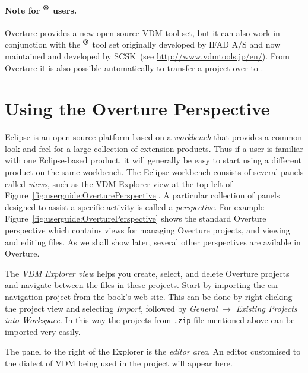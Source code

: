 \paragraph{Note for \vdmtools$^{\mbox{\small\textbf{{\textregistered}}}}$ users.} 
Overture provides a new open source VDM tool set, but it can also work
in conjunction with the
\vdmtools$^{\mbox{\small\textbf{{\textregistered}}}}$
tool set originally developed by IFAD A/S and now maintained and
developed by SCSK~(see
\url{http://www.vdmtools.jp/en/}). From Overture it is also possible
automatically to transfer a project over to \vdmtools.
 
\section{Using the Overture Perspective}\label{sec:vdmsupport}

Eclipse is an open source platform based on a \emph{workbench} that
provides a common look and feel for a large collection of extension
products. Thus if a user is familiar with one Eclipse-based product,
it will generally be easy to start using a different product on the
same workbench. The Eclipse workbench consists of several panels
called \emph{views}, such as the VDM Explorer view at the top left
of Figure~\ref{fig:userguide:OverturePerspective}. A particular
collection of panels designed to assist a specific activity is called a
\emph{perspective}. For example
Figure~\ref{fig:userguide:OverturePerspective} shows the standard
Overture perspective which contains views for managing Overture
projects, and viewing and editing files. As we shall show later,
several other perspectives are avilable in Overture.

The \emph{VDM Explorer view} helps you create, select, and delete
Overture projects and navigate between the files in these
projects. Start by importing the car navigation project from the
book's web site. This can be done by right clicking the project view
and selecting \emph{Import}, followed by \emph{General} $\rightarrow$
\emph{Existing Projects into Workspace}.  In this way the projects
from \texttt{.zip} file mentioned above can be imported very easily.

The panel to the right of the Explorer is the \emph{editor area}. An
editor customised to the dialect of VDM being used in the project will
appear here.

